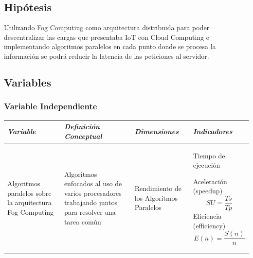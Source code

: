     \subsection{Hipótesis}
        Utilizando Fog Computing como arquitectura distribuida para poder descentralizar las cargas que presentaba IoT con Cloud Computing e implementando algoritmos paralelos en cada punto donde se procesa la información se podrá reducir la latencia de las peticiones al servidor.\par
    \subsection{Variables}
        \subsubsection{Variable Independiente}
            \begin{table}[h!]
                \centering
                \begin{tabular}{|p{3cm}|p{3cm}|p{3cm}|p{3cm}|} \hline
                    
                
                \textit{{\bf{Variable}}} &
                \textit{{\bf{Definición Conceptual}}} &
                \textit{{\bf{Dimensiones}}} &
                \textit{{\bf{Indicadores}}}
                \\ \hline

                Algoritmos paralelos sobre la arquitectura Fog Computing &
                Algoritmos enfocados al uso de varios procesadores trabajando juntos para resolver una tarea común &
                Rendimiento de los Algoritmos Paralelos &
                Tiempo de ejecución \par
                Aceleración (speedup) 
                \begin{equation*}\label{}
                    SU = \frac{Ts}{Tp}
                \end{equation*}   
                Eficiencia (efficiency) 
                \begin{equation*}\label{}
                    E(n) = \frac{S(n)}{n}
                \end{equation*}                

                \\ \hline

                \end{tabular}
            \end{table}
